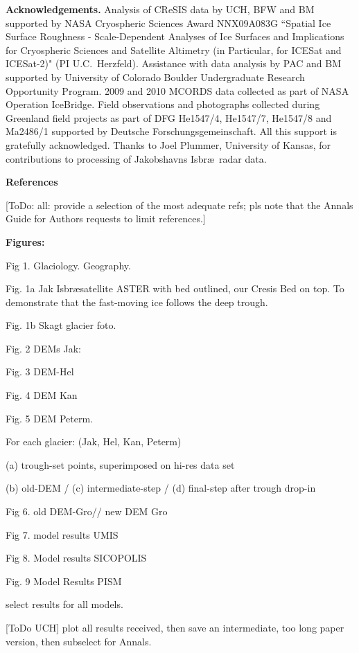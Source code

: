 \documentclass[11pt]{article}
\begin{document}
 
 
 
 
 \bs
 {\bf Acknowledgements.} 
  Analysis of CReSIS data by UCH, BFW and BM supported by NASA Cryospheric Sciences Award NNX09A083G
``Spatial Ice Surface Roughness - Scale-Dependent Analyses of Ice Surfaces and
Implications for Cryospheric Sciences and Satellite Altimetry (in Particular, for ICESat and ICESat-2)" (PI U.C.~Herzfeld).
Assistance with  data analysis  by
 PAC and BM supported by University of Colorado Boulder Undergraduate Research
 Opportunity Program. 
2009 and 2010 MCORDS data collected as part of NASA Operation IceBridge.
 Field observations and photographs collected during Greenland field projects as part of  DFG He1547/4, He1547/7, He1547/8 and Ma2486/1 supported by Deutsche Forschungsgemeinschaft. All this support is gratefully acknowledged. 
  Thanks to Joel Plummer, University of Kansas,  for  contributions to processing of Jakobshavns Isbr\ae\ radar data. 
 
 
 \bs 
 {\bf References}
 
 [ToDo: all: provide a selection of the most adequate refs; pls note that the Annals Guide for Authors requests to limit references.]
 
 
 \bs
 
 
 
 
 {\bf Figures:}
 
 Fig 1. Glaciology. Geography.
 
 Fig. 1a Jak Isbr\ae satellite ASTER with bed outlined, our Cresis Bed on top.
 To demonstrate that the fast-moving ice follows the deep trough.
 
 Fig. 1b  Skagt glacier foto.
 
 Fig. 2 DEMs Jak: 
 
 Fig. 3 DEM-Hel
 
 Fig. 4 DEM Kan
 
 Fig. 5 DEM Peterm.
 
 For each glacier: (Jak, Hel, Kan, Peterm)
 
(a)  trough-set  points, superimposed on hi-res data set
 
(b) old-DEM / (c) intermediate-step / (d)  final-step after trough drop-in
 
 Fig 6. old DEM-Gro// new DEM Gro
 
 Fig 7. model results UMIS
 
 Fig 8. Model results SICOPOLIS
 
 Fig. 9 Model Results PISM
 
 select results for all models.
 
[ToDo UCH] plot all results received, then save an intermediate, too long paper version, then subselect for Annals.
 
 
 
 
 
 
 
\end{document}
